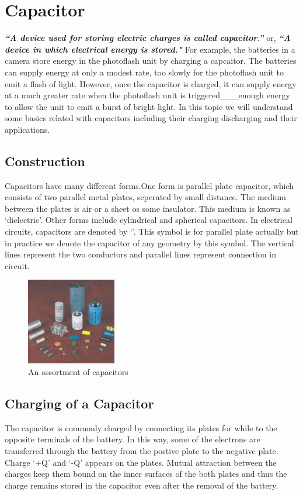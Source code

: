 \section{Capacitor}
\textit{\textbf{``A device used for storing electric charges is called capacitor.”}}
or, \textit{\textbf{“A device in which electrical energy is stored."}}
For example, the batteries in a camera store energy in the photoflash
unit by charging a capcaitor. The batteries can supply energy at only a
modest rate, too slowly for the photoflash unit to emit a flash of light.
However, once the capacitor is charged, it can supply energy at a much
greater rate when the photoflash unit is triggered\_\_\_enough energy to
allow the unit to emit a burst of bright light. In this topic we
will understand some basics related with capacitors
including their charging discharging and their applications.
\subsection*{Construction}
Capacitors have many different forms.One form is parallel plate capacitor,
which consists of two parallel metal plates, seperated by small distance.
The medium between the plates is air or a sheet os some insulator.
This medium is known as ‘dielectric’. Other forms include cylindrical
and spherical capacitors. In electrical circuits,
capacitors are denoted by ‘\capacitor{}’. This symbol is for parallel plate
actually but in practice we denote the capacitor of any geometry by
this symbol. The vertical lines represent the
two conductors and parallel lines represent connection in circuit.

\begin{figure}[H]
  \centering
  \includegraphics[width=0.35\textwidth]{Images/capacitors.png}
  \caption{An assortment of capacitors}
  \label{fig:11.9}
\end{figure}
\subsection*{Charging of a Capacitor}
The capacitor is commonly charged by connecting its plates for while to
the opposite terminals of the battery. In this way, some of the electrons
are transferred through the battery from the postive plate to the negative
plate. Charge ‘+Q’ and ‘-Q’ appears on the plates. Mutual attraction between
the charges keep them bound on the inner surfaces of the both plates and
thus the charge remains stored in the capacitor even after the removal of
the battery.
